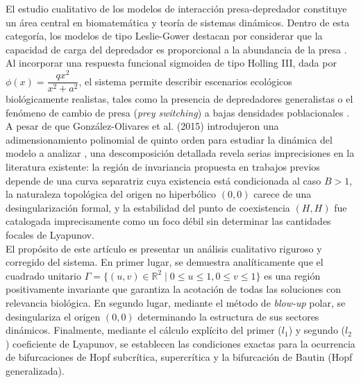 \documentclass[]{article}
\theoremstyle{remark}
\begin{document}
	El estudio cualitativo de los modelos de interacción presa-depredador constituye un área central en biomatemática y teoría de sistemas dinámicos. Dentro de esta categoría, los modelos de tipo Leslie-Gower destacan por considerar que la capacidad de carga del depredador es proporcional a la abundancia de la presa \cite{leslie}. Al incorporar una respuesta funcional sigmoidea de tipo Holling III, dada por $\phi(x) = \dfrac{q x^2}{x^2 + a^2}$, el sistema permite describir escenarios ecológicos biológicamente realistas, tales como la presencia de depredadores generalistas o el fenómeno de cambio de presa (\textit{prey switching}) a bajas densidades poblacionales \cite{murray}. \\
	
	\noindent A pesar de que González-Olivares et al. (2015) introdujeron una adimensionamiento polinomial de quinto orden para estudiar la dinámica del modelo a analizar \cite{articulo}, una descomposición detallada revela serias imprecisiones en la literatura existente: la región de invariancia propuesta en trabajos previos depende de una curva separatriz cuya existencia está condicionada al caso $B > 1$, la naturaleza topológica del origen no hiperbólico $(0,0)$ carece de una desingularización formal, y la estabilidad del punto de coexistencia $(H,H)$ fue catalogada imprecisamente como un foco débil sin determinar las cantidades focales de Lyapunov. \\
	
	\noindent El propósito de este artículo es presentar un análisis cualitativo riguroso y corregido del sistema. En primer lugar, se demuestra analíticamente que el cuadrado unitario $\Gamma = \{ (u,v) \in \mathbb{R}^2 \mid 0 \le u \le 1, 0 \le v \le 1 \}$ es una región positivamente invariante que garantiza la acotación de todas las soluciones con relevancia biológica. En segundo lugar, mediante el método de \textit{blow-up} polar, se desingulariza el origen $(0,0)$ determinando la estructura de sus sectores dinámicos. Finalmente, mediante el cálculo explícito del primer ($l_1$) y segundo ($l_2$) coeficiente de Lyapunov, se establecen las condiciones exactas para la ocurrencia de bifurcaciones de Hopf subcrítica, supercrítica y la bifurcación de Bautin (Hopf generalizada).
	
\end{document}
